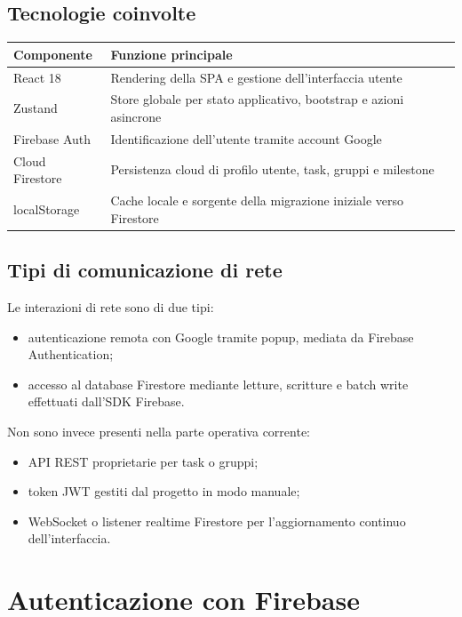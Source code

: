 \documentclass[11pt,a4paper]{article}
\begin{document}
\subsection{Tecnologie coinvolte}

\begin{center}
\begin{tabular}{p{3.2cm} p{9.3cm}}
\toprule
Componente & Funzione principale \\
\midrule
React 18 & Rendering della SPA e gestione dell'interfaccia utente \\
Zustand & Store globale per stato applicativo, bootstrap e azioni asincrone \\
Firebase Auth & Identificazione dell'utente tramite account Google \\
Cloud Firestore & Persistenza cloud di profilo utente, task, gruppi e milestone \\
localStorage & Cache locale e sorgente della migrazione iniziale verso Firestore \\
\bottomrule
\end{tabular}
\end{center}

\subsection{Tipi di comunicazione di rete}

Le interazioni di rete sono di due tipi:

\begin{itemize}
  \item autenticazione remota con Google tramite popup, mediata da Firebase Authentication;
  \item accesso al database Firestore mediante letture, scritture e batch write effettuati dall'SDK Firebase.
\end{itemize}

Non sono invece presenti nella parte operativa corrente:

\begin{itemize}
  \item API REST proprietarie per task o gruppi;
  \item token JWT gestiti dal progetto in modo manuale;
  \item WebSocket o listener realtime Firestore per l'aggiornamento continuo dell'interfaccia.
\end{itemize}

\section{Autenticazione con Firebase}
\end{document}
